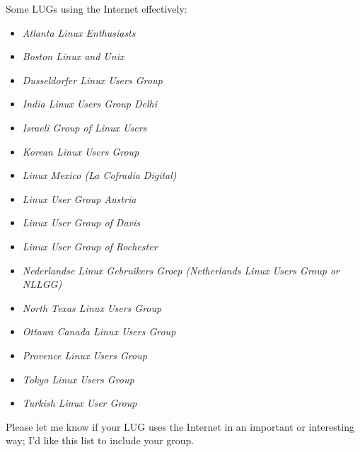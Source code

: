Some LUGs using the Internet effectively:

\begin{itemize}
\item 
\emph{Atlanta Linux Enthusiasts} \texttt{\advurl}
\item 
\emph{Boston Linux and Unix} \texttt{\adwurl}
\item 
\emph{Dusseldorfer Linux Users Group} \texttt{\adxurl}
\item 
\emph{India Linux Users Group Delhi} \texttt{\adyurl}
\item 
\emph{Israeli Group of Linux Users} \texttt{\adzurl}
\item 
\emph{Korean Linux Users Group} \texttt{\aeaurl}
\item 
\emph{Linux Mexico (La Cofradia Digital)} \texttt{\aeburl}
\item 
\emph{Linux User Group Austria} \texttt{\aecurl}
\item 
\emph{Linux User Group of Davis} \texttt{\aedurl}
\item 
\emph{Linux User Group of Rochester} \texttt{\aeeurl}
\item 
\emph{Nederlandse Linux Gebruikers Groep (Netherlands Linux Users Group or NLLGG)} \texttt{\aefurl}
\item 
\emph{North Texas Linux Users Group} \texttt{\aegurl}
\item 
\emph{Ottawa Canada Linux Users Group} \texttt{\aehurl}
\item 
\emph{Provence Linux Users Group} \texttt{\aeiurl}
\item 
\emph{Tokyo Linux Users Group} \texttt{\aejurl}
\item 
\emph{Turkish Linux User Group} \texttt{\aekurl}
\end{itemize}




Please let me know if your LUG uses the Internet in an important or
interesting way; I'd like this list to include your group.




